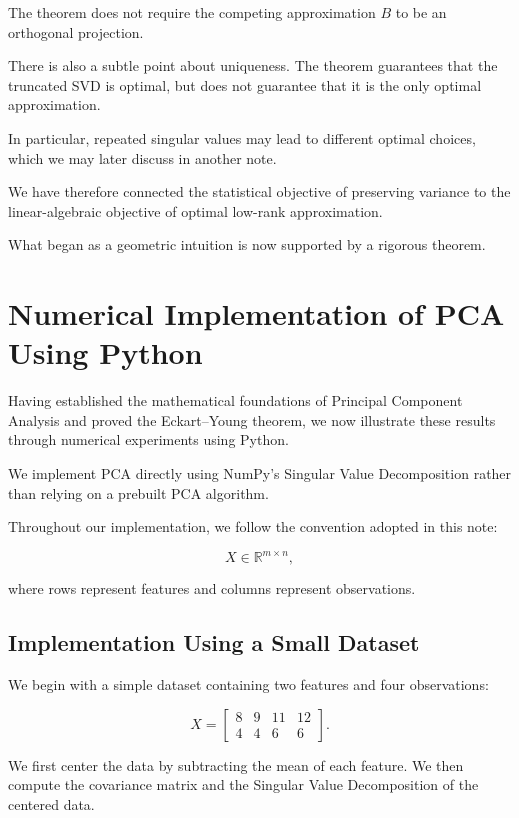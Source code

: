 \documentclass[11pt]{article}
\begin{document}
The theorem does not require the competing
approximation $B$ to be an orthogonal
projection.

There is also a subtle point about
uniqueness. The theorem guarantees
that the truncated SVD is optimal,
but does not guarantee that it is
the only optimal approximation.

In particular, repeated singular values
may lead to different optimal choices, which we may later discuss in another note.

We have therefore connected the
statistical objective of preserving
variance to the linear-algebraic
objective of optimal low-rank
approximation.

What began as a geometric intuition
is now supported by a rigorous theorem.

\section{Numerical Implementation of PCA Using Python}

Having established the mathematical foundations
of Principal Component Analysis and proved the
Eckart--Young theorem, we now illustrate these
results through numerical experiments using Python.

We implement PCA directly using NumPy's Singular
Value Decomposition rather than relying on a
prebuilt PCA algorithm.

Throughout our implementation, we follow the
convention adopted in this note:

\[
X\in\mathbb{R}^{m\times n},
\]

where rows represent features and columns
represent observations.

\subsection{Implementation Using a Small Dataset}

We begin with a simple dataset containing
two features and four observations:

\[
X=
\begin{bmatrix}
8 & 9 & 11 & 12\\
4 & 4 & 6 & 6
\end{bmatrix}.
\]

We first center the data by subtracting
the mean of each feature. We then compute
the covariance matrix and the Singular
Value Decomposition of the centered data.
\end{document}
